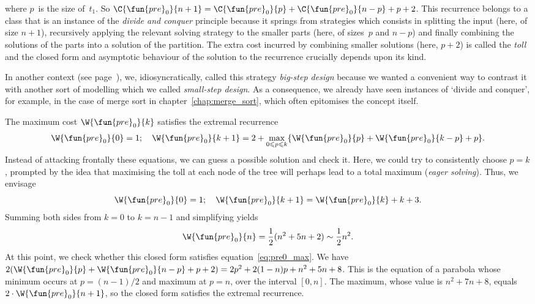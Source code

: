 where \(p\)~is the size of~\(t_1\). So \(\C{\fun{pre}_0}{n+1} =
\C{\fun{pre}_0}{p} + \C{\fun{pre}_0}{n-p} + p + 2\). This recurrence
belongs to a class that is an instance of the \emph{divide and
conquer} principle because it springs from
strategies which consists in splitting the input (here, of size
\(n+1\)), recursively applying the relevant solving strategy to the
smaller parts (here, of sizes~\(p\) and \(n-p\)) and finally combining
the solutions of the parts into a solution of the partition. The extra
cost incurred by combining smaller solutions (here, \(p+2\)) is called
the \emph{toll} and the closed form and asymptotic
behaviour of the solution to the recurrence crucially depends upon its
kind.

In another context (see page~\pageref{big-step}), we,
idiosyncratically, called this strategy \emph{big\hyp{}step design}
 because we wanted a convenient way to
contrast it with another sort of modelling which we called
\emph{small\hyp{}step design}. As a
consequence, we already have seen instances of `divide and conquer',
for example, in the case of merge sort in
chapter~\vref{chap:merge_sort}, which often epitomises the concept
itself.

The maximum cost
\(\W{\fun{pre}_0}{k}\) satisfies the
extremal recurrence
\begin{equation}
\W{\fun{pre}_0}{0} = 1;\quad
\W{\fun{pre}_0}{k+1} =
  2 + \max_{0 \leqslant p \leqslant k}\{\W{\fun{pre}_0}{p}
                                  + \W{\fun{pre}_0}{k-p} + p\}.
\index{pre0@$\W{\fun{pre}_0}{n}$}
\label{eq:pre0_max}
\end{equation}
Instead of attacking frontally these equations, we can guess a
possible solution and check it. Here, we could try to consistently
choose \(p=k\), prompted by the idea that maximising the toll at each
node of the tree will perhaps lead to a total maximum (\emph{eager
  solving}). Thus, we envisage
\begin{equation}
\W{\fun{pre}_0}{0} = 1;\quad
\W{\fun{pre}_0}{k+1} = \W{\fun{pre}_0}{k} + k + 3.
\label{eq:max_pre0_rec}
\end{equation}
Summing both sides from \(k=0\) to \(k=n-1\) and simplifying yields
\begin{equation*}
\W{\fun{pre}_0}{n} = \frac{1}{2}(n^2 + 5n + 2) \sim \frac{1}{2}n^2.
\end{equation*}
At this point, we check whether this closed form satisfies
equation~\eqref{eq:pre0_max}. We have \(2(\W{\fun{pre}_0}{p} +
\W{\fun{pre}_0}{n-p} + p + 2) = 2p^2 + 2(1-n)p + n^2 + 5n + 8\). This
is the equation of a parabola whose minimum occurs at \(p = (n-1)/2\)
and maximum at \(p = n\), over the interval \([0,n]\). The maximum,
whose value is \(n^2 + 7n + 8\), equals \(2 \cdot
\W{\fun{pre}_0}{n+1}\), so the closed form satisfies the extremal
recurrence.


